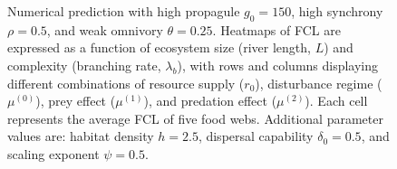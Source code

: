 \begin{figure}
\centering
{}
\caption{Numerical prediction with high propagule \(g_0 = 150\), high
synchrony \(\rho = 0.5\), and weak omnivory \(\theta = 0.25\). Heatmaps
of FCL are expressed as a function of ecosystem size (river length,
\(L\)) and complexity (branching rate, \(\lambda_b\)), with rows and
columns displaying different combinations of resource supply (\(r_0\)),
disturbance regime (\(\mu^{(0)}\)), prey effect (\(\mu^{(1)}\)), and
predation effect (\(\mu^{(2)}\)). Each cell represents the average FCL
of five food webs. Additional parameter values are: habitat density
\(h=2.5\), dispersal capability \(\delta_0=0.5\), and scaling exponent
\(\psi=0.5\).}
\end{figure}

\newpage

